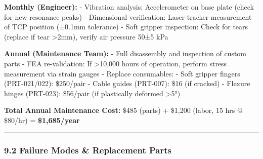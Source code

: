 \documentclass[
]{article}
\begin{document}
\textbf{Monthly (Engineer):} - Vibration analysis: Accelerometer on base
plate (check for new resonance peaks) - Dimensional verification: Laser
tracker measurement of TCP position (±0.1mm tolerance) - Soft gripper
inspection: Check for tears (replace if tear \textgreater2mm), verify
air pressure 50±5 kPa

\textbf{Annual (Maintenance Team):} - Full disassembly and inspection of
custom parts - FEA re-validation: If \textgreater10,000 hours of
operation, perform stress measurement via strain gauges - Replace
consumables: - Soft gripper fingers (PRT-021/022): \$250/pair - Cable
guides (PRT-007): \$16 (if cracked) - Flexure hinges (PRT-023):
\$56/pair (if plastically deformed \textgreater5°)

\textbf{Total Annual Maintenance Cost:} \$485 (parts) + \$1,200 (labor,
15 hrs @ \$80/hr) = \textbf{\$1,685/year}

\begin{center}\rule{0.5\linewidth}{0.5pt}\end{center}

\hypertarget{failure-modes-replacement-parts}{%
\subsubsection{9.2 Failure Modes \& Replacement
Parts}\label{failure-modes-replacement-parts}}
\end{document}
